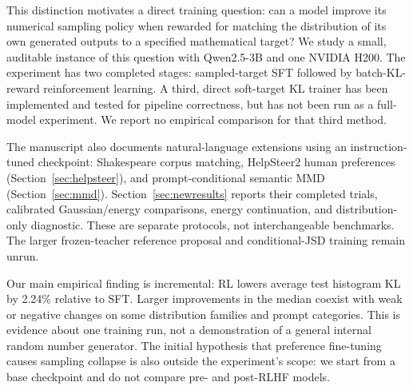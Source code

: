 \documentclass[11pt,letterpaper]{article}
\begin{document}
This distinction motivates a direct training question: can a model improve its
numerical sampling policy when rewarded for matching the distribution of its
own generated outputs to a specified mathematical target? We study a small,
auditable instance of this question with Qwen2.5-3B and one NVIDIA H200.
The experiment has two completed stages: sampled-target SFT followed by
batch-KL-reward reinforcement learning. A third, direct soft-target KL trainer
has been implemented and tested for pipeline correctness, but has not been
run as a full-model experiment. We report no empirical comparison for that
third method.

The manuscript also documents natural-language extensions using an
instruction-tuned checkpoint: Shakespeare corpus matching, HelpSteer2
human preferences (Section~\ref{sec:helpsteer}), and prompt-conditional
semantic MMD (Section~\ref{sec:mmd}). Section~\ref{sec:newresults}
reports their completed trials, calibrated Gaussian/energy comparisons,
energy continuation, and distribution-only diagnostic. These are separate
protocols, not interchangeable benchmarks. The larger frozen-teacher
reference proposal and conditional-JSD training remain unrun.

Our main empirical finding is incremental: RL lowers average test histogram KL
by 2.24\% relative to SFT. Larger improvements in the median coexist with weak
or negative changes on some distribution families and prompt categories. This
is evidence about one training run, not a demonstration of a general internal
random number generator. The initial hypothesis that preference fine-tuning
causes sampling collapse is also outside the experiment's scope: we start
from a base checkpoint and do not compare pre- and post-RLHF models.
\end{document}
